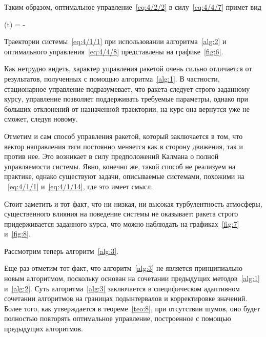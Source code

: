 Таким образом, оптимальное управление~\vref{eq:4/2/2} в силу~\ref{eq:4/4/7} примет вид

    \optU(t) = - 
\eeq

Траектории системы~\ref{eq:4/1/1} при использовании алгоритма~\ref{alg:2} и оптимального управления~\ref{eq:4/4/8} представлены на графике~\ref{fig:6}.


Как нетрудно видеть, характер управления ракетой очень сильно отличается от результатов, полученных с помощью алгоритма~\ref{alg:1}. В частности, стационарное управление подразумевает, что ракета следует строго заданному курсу, управление позволяет поддерживать требуемые параметры, однако при больших отклонений от назначенной траектории, на курс она вернутся уже не сможет, следуя новому.

Отметим и сам способ управления ракетой, который заключается в том, что вектор направления тяги постоянно меняется как в сторону движения, так и против нее. Это возникает в силу предположений Калмана\cite{KALMAN1} о полной управляемости системы. Явно, конечно же, такой способ не реализуем на практике, однако существуют задачи, описываемые системами, похожими на ~\ref{eq:4/1/1} и~\ref{eq:4/1/14}, где это имеет смысл.

Стоит заметить и тот факт, что ни низкая, ни высокая турбулентность атмосферы, существенного влияния на поведение системы не оказывает: ракета строго придерживается заданного курса, что можно наблюдать на графиках~\ref{fig:7} и~\ref{fig:8}.


\br

Рассмотрим теперь алгоритм~\vref{alg:3}.

Еще раз отметим тот факт, что алгоритм~\ref{alg:3} не является принципиально новым алгоритмом, поскольку основан на сочетании предыдущих методов~\ref{alg:1} и~\ref{alg:2}. Суть алгоритма~\ref{alg:3} заключается в специфическом адаптивном сочетании алгоритмов на границах подынтервалов и корректировке значений. Более того, как утверждается в теореме~\ref{teo:8}, при отсутствии шумов, оно будет полностью повторять оптимальное управление, построенное с помощью предыдущих алгоритмов.

